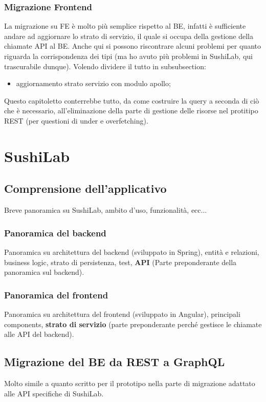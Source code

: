 \subsubsection*{Migrazione Frontend}
La migrazione su FE è molto più semplice rispetto al BE, infatti è sufficiente andare ad aggiornare lo strato di servizio, il quale si occupa della gestione della chiamate API al BE. Anche qui si possono riscontrare alcuni problemi per quanto riguarda la corrispondenza dei tipi (ma ho avuto più problemi in SushiLab, qui trascurabile dunque).
Volendo dividere il tutto in subsubsection:
\begin{itemize}
  \item aggiornamento strato servizio con modulo apollo;
\end{itemize}
Questo capitoletto conterrebbe tutto, da come costruire la query a seconda di ciò che è necessario, all'eliminazione della parte di gestione delle risorse nel protitipo REST (per questioni di under e overfetching).

\section{SushiLab}
\label{sushi-lab}
\subsection{Comprensione dell'applicativo}
Breve panoramica su SushiLab, ambito d'uso, funzionalità, ecc...
\subsubsection{Panoramica del backend}
Panoramica su architettura del backend (sviluppato in Spring), entità e relazioni, business logic, strato di persistenza, test, \textbf{API} (Parte preponderante della panoramica sul backend).
\subsubsection{Panoramica del frontend}
Panoramica su architettura del frontend (sviluppato in Angular), principali components, \textbf{strato di servizio} (parte preponderante perché gestisce le chiamate alle API del backend).
\subsection{Migrazione del BE da REST a GraphQL}
Molto simile a quanto scritto per il prototipo nella parte di migrazione adattato alle API specifiche di SushiLab.
